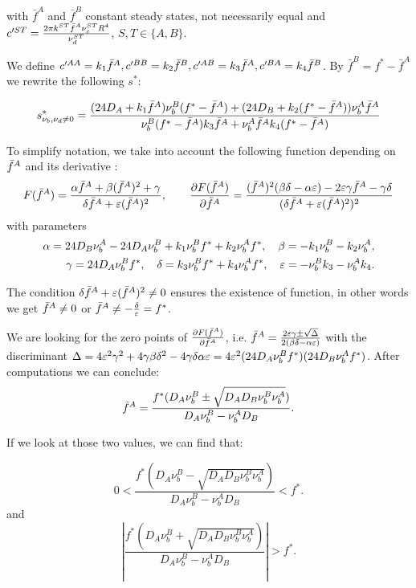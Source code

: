 with $\bar{f}^A$ and $\bar{f}^B$ constant steady states, not necessarily equal and 
$c'^{ST}=\frac{2\pi k^{ST} {\bar{f}^A} \nu_c^{ST} R^{4}}{\nu_d^{ST}}$, $S,T \in \{ A,B \}$.

We define $c'^{AA}=k_1 {\bar{f}^A}, c'^{BB}=k_2{\bar{f}^B}, c'^{AB}=k_3{\bar{f}^A}, c'^{BA}=k_4{\bar{f}^B}$.
By $\bar{f}^B=f^*-\bar{f}^A$ we rewrite the following $s^*$:

\begin{equation}
s^{*}_{\nu_b,\nu_d \ne 0}=\frac{(24 D_A+k_1{\bar{f}^A})\nu_{b}^{B}(f^*-{\bar{f}^A})+(24 D_B+k_2(f^*-{\bar{f}^A}))\nu_{b}^{A}\bar{f}^A}{\nu_{b}^{B}(f^*-{\bar{f}^A})k_3{\bar{f}^A}+\nu_{b}^{A}\bar{f}^Ak_4(f^*-{\bar{f}^A})}
\end{equation}

To simplify notation, we take into account the following function depending on ${\bar{f}^A}$ and its derivative :
$$F({\bar{f}^A})=\frac{{\alpha} {\bar{f}^A} + {\beta} ({\bar{f}^A})^2 + {\gamma}}{{\delta} {\bar{f}^A} + \varepsilon({\bar{f}^A})^2}, \quad\quad 
\frac{{\partial} F({\bar{f}^A})}{{\partial} {\bar{f}^A}}=\frac{({\bar{f}^A})^2({\beta} {\delta}-{\alpha} \varepsilon)-2\varepsilon {\gamma} {\bar{f}^A} - {\gamma}{\delta}}{({\delta} {\bar{f}^A}+\varepsilon ({\bar{f}^A})^2)^2}$$ 
with parameters 
\begin{align}
{\alpha}= 24D_B \nu_b^A -24 D_A \nu_b^B +k_1 \nu_b^B f^* + k_2 \nu_b^A f^*, \quad
{\beta}=-k_1 \nu_b^B -k_2 \nu_b^A, \\
{\gamma}= 24 D_A \nu_b^B f^*, \quad 
{\delta}= k_3\nu_b^B f^*+k_4 \nu_b^A f^*, \quad
\varepsilon= -\nu_b^B k_3-	\nu_b^A k_4.
\end{align}

\begin{remark}
	The condition ${\delta} {\bar{f}^A} + \varepsilon ({\bar{f}^A})^2 \ne 0 $ ensures the existence of function, in other words we get  ${\bar{f}^A} \ne 0 $ or ${\bar{f}^A} \ne -\frac{{\delta}}{\varepsilon}=f^*$. 
\end{remark}

We are looking for the zero points of $\frac{{\partial} F({\bar{f}^A})}{{\partial} {\bar{f}^A}}$, i.e. 
$ {\bar{f}^A}=\frac{2 \varepsilon {\gamma} \pm \sqrt{\Delta}}{2({\beta} {\delta} - {\alpha} \varepsilon )} $ with the discriminant
$\Delta=4\varepsilon^2 {\gamma}^2 + 4 {\gamma} {\beta} {\delta}^2 -4 {\gamma} {\delta} {\alpha} \varepsilon = 4\varepsilon^2(24D_A \nu_b^B f^*)(24 D_B \nu_b^A f^*)$. After computations we can conclude:
\begin{equation}
{\bar{f}^A}=\frac{f^*(D_A \nu_b^B \pm \sqrt{D_A D_B \nu_b^B \nu_b^A})}{D_A \nu_b^B -\nu_b^A D_B}.
\end{equation}

If we look at those two values, we can find that:

\begin{equation}
 0<\frac{f^*(D_A \nu_b^B - \sqrt{D_A D_B \nu_b^B \nu_b^A})}{D_A \nu_b^B -\nu_b^A D_B}<f^*.
\end{equation}
and
\begin{equation}
 \left|\frac{f^*(D_A \nu_b^B + \sqrt{D_A D_B \nu_b^B \nu_b^A})}{D_A \nu_b^B -\nu_b^A D_B}\right|>f^*.
\end{equation}






